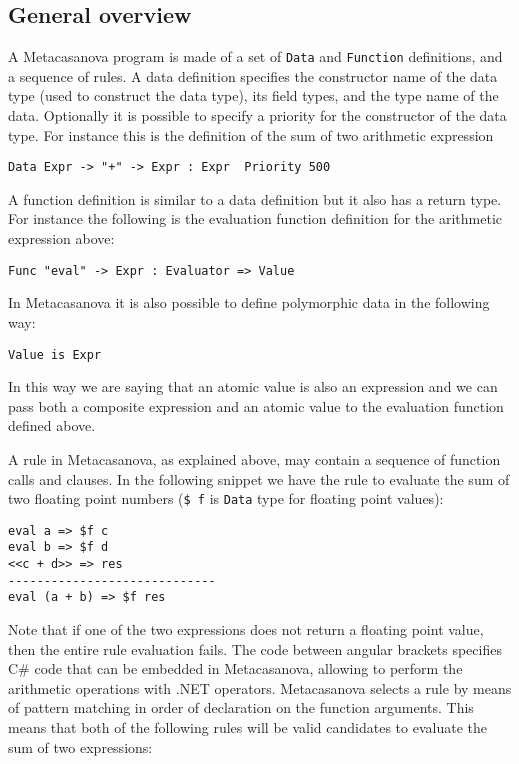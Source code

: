 \subsection{General overview}

A Metacasanova program is made of a set of \texttt{Data} and \texttt{Function} definitions, and a sequence of rules. A data definition specifies the constructor name of the data type (used to construct the data type), its field types, and the type name of the data. Optionally it is possible to specify a priority for the constructor of the data type. For instance this is the definition of the sum of two arithmetic expression

\begin{lstlisting}
Data Expr -> "+" -> Expr : Expr  Priority 500
\end{lstlisting}

\noindent
A function definition is similar to a data definition but it also has a return type. For instance the following is the evaluation function definition for the arithmetic expression above:

\begin{lstlisting}
Func "eval" -> Expr : Evaluator => Value
\end{lstlisting}

\noindent
In Metacasanova it is also possible to define polymorphic data in the following way:

\begin{lstlisting}
Value is Expr
\end{lstlisting}

\noindent
In this way we are saying that an atomic value is also an expression and we can pass both a composite expression and an atomic value to the evaluation function defined above.

A rule in Metacasanova, as explained above, may contain a sequence of function calls and clauses. In the following snippet we have the rule to evaluate the sum of two floating point numbers (\texttt{\$ f} is \texttt{Data} type for floating point values):

\begin{lstlisting}
eval a => $f c
eval b => $f d
<<c + d>> => res
-----------------------------
eval (a + b) => $f res
\end{lstlisting}

\noindent
Note that if one of the two expressions does not return a floating point value, then the entire rule evaluation fails. The code between angular brackets specifies C\# code that can be embedded in Metacasanova, allowing to perform the arithmetic operations with .NET operators. Metacasanova selects a rule by means of pattern matching in order of declaration on the function arguments. This means that both of the following rules will be valid candidates to evaluate the sum of two expressions:

